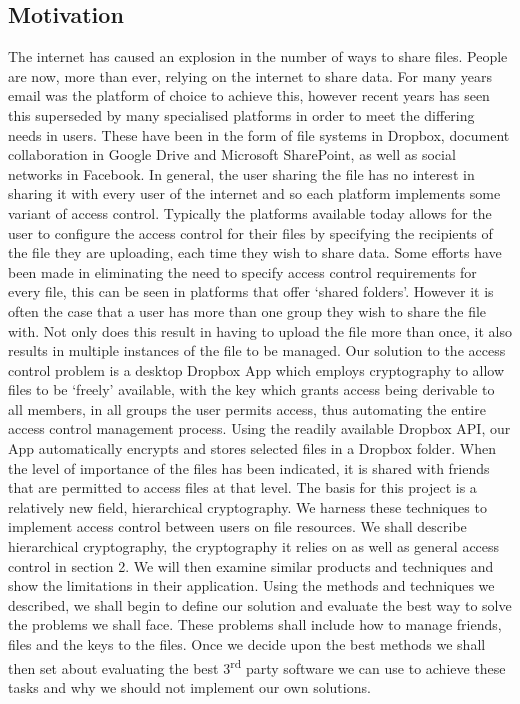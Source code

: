 \documentclass[12pt, titlepage]{article}
\begin{document}
\subsection{Motivation}
The internet has caused an explosion in the number of ways to share files. People are now, more than ever, relying on the internet to share data. For many years email was the platform of choice to achieve this, however recent years has seen this superseded by many specialised platforms in order to meet the differing needs in users. These have been in the form of file systems in Dropbox, document collaboration in Google Drive and Microsoft SharePoint, as well as social networks in Facebook. In general, the user sharing the file has no interest in sharing it with every user of the internet and so each platform implements some variant of access control. Typically the platforms available today allows for the user to configure the access control for their files by specifying the recipients of the file they are uploading, each time they wish to share data. Some efforts have been made in eliminating the need to specify access control requirements for every file, this can be seen in platforms that offer `shared folders'. However it is often the case that a user has more than one group they wish to share the file with. Not only does this result in having to upload the file more than once, it also results in multiple instances of the file to be managed. Our solution to the access control problem is a desktop Dropbox App which employs cryptography to allow files to be `freely' available, with the key which grants access being derivable to all members, in all groups the user permits access, thus automating the entire access control management process. Using the readily available Dropbox API, our App automatically encrypts and stores selected files in a Dropbox folder. When the level of importance of the files has been indicated, it is shared with friends that are permitted to access files at that level.
\newline
\newline \indent The basis for this project is a relatively new field, hierarchical cryptography. We harness these techniques to implement access control between users on file resources. We shall describe hierarchical cryptography, the cryptography it relies on as well as general access control in section 2. We will then examine similar products and techniques and show the limitations in their application.
\newline \indent Using the methods and techniques we described, we shall begin to define our solution and evaluate the best way to solve the problems we shall face. These problems shall include how to manage friends, files and the keys to the files. Once we decide upon the best methods we shall then set about evaluating the best 3\textsuperscript{rd} party software we can use to achieve these tasks and why we should not implement our own solutions.
\end{document}
